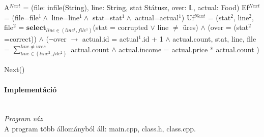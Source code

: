 \documentclass[12pt]{report}
\newcommand{\forceindent}{\leavevmode{\parindent=2.8em\indent}}
\begin{document}
A$^{Next}$ = (file: infile(String), line: String, stat Státusz, over: $\mathbb{L}$, actual: Food)\newline
Ef$^{Next}$ = (file=file$^{1} \wedge$ line=line$^{1} \wedge$ stat=stat$^{1} \wedge$ actual=actual$^{1}$)\newline
Uf$^{Next}$ = (stat$^{2}$, line$^{2}$, file$^{2}$ = $\mathbf{select}_{line \in (line^{1},file^{1})}$(stat = corrupted $\vee$ line $\neq$ üres) $\wedge$ \newline
\forceindent (over = (stat$^{2}$=correct)) $\wedge$ \newline
\forceindent ($\neg$over $\rightarrow$ \newline
\forceindent actual.id = actual$^{1}$.id + 1 \newline
\forceindent $\wedge$ actual.count, stat, line, file = $\sum\limits_{line \in (line^{2}, file^{2})}^{line \neq \ddot{u}res}$ actual.count \newline
\forceindent $\wedge$ actual.income = actual.price * actual.count
)\newline

\begin{stuki*}{ Next() }
\begin{WHILE}{1}{}
\end{WHILE}
\begin{IF}{14}{  }
\begin{WHILE}{8}{}
\end{WHILE}
\ELSE
{}
\end{IF}
\end{stuki*}%

\paragraph{Implementáció} \hspace{0pt} \\
\textit{Program váz} \\
A program több állományból áll: main.cpp, class.h, class.cpp.
\pagebreak
\end{document}
